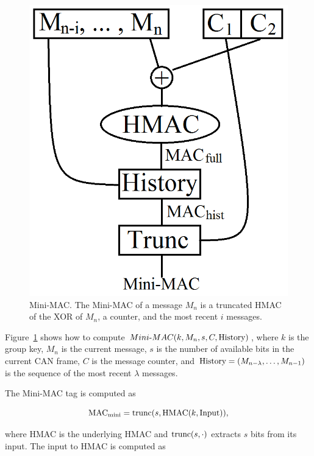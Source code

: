 	\begin{figure}
		\centering
		\includegraphics[width=\columnwidth]{figures/minimac_diagram.png}
		\caption{Mini-MAC. The Mini-MAC of a message $M_n$ is a truncated HMAC of 
		the XOR of $M_n$, a counter, and the most recent $i$ messages.}
		\label{fig-minimac}
	\end{figure}

Figure~\ref{fig-minimac} shows how to compute 
$Mini\hbox{-}MAC(k,M_n,s,C,\hbox{History})$, 
where $k$ is the group key, 
$M_n$ is the current message, 
$s$ is the number of available bits in the current CAN frame, 
$C$ is the message counter, 
and $\hbox{History} = (M_{n-{\lambda}}, \ldots, M_{n-1})$ is the sequence of the most recent
$\lambda$ messages.

The Mini-MAC tag is computed as

\begin{equation}
\text{MAC}_{\text{mini}} = \hbox{trunc(}s,\text{HMAC}(k,\text{Input})),
\end{equation}

\noindent where HMAC is the underlying HMAC and $\hbox{trunc}(s,\cdot)$
extracts $s$ bits from its input.  The input to HMAC is computed as

